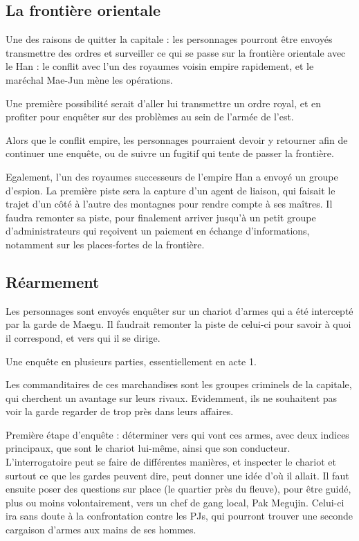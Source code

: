 \documentclass[10pt,a4paper]{book}
\begin{document}
\subsection{La frontière orientale}
Une des raisons de quitter la capitale : les personnages pourront être envoyés transmettre des ordres et surveiller ce qui se passe sur la frontière orientale avec le Han : le conflit avec l'un des royaumes voisin empire rapidement, et le maréchal Mae-Jun mène les opérations.

Une première possibilité serait d'aller lui transmettre un ordre royal, et en profiter pour enquêter sur des problèmes au sein de l'armée de l'est.

Alors que le conflit empire, les personnages pourraient devoir y retourner afin de continuer une enquête, ou de suivre un fugitif qui tente de passer la frontière.

Egalement, l'un des royaumes successeurs de l'empire Han a envoyé un groupe d'espion. La première piste sera la capture d'un agent de liaison, qui faisait le trajet d'un côté à l'autre des montagnes pour rendre compte à ses maîtres. Il faudra remonter sa piste, pour finalement arriver jusqu'à un petit groupe d'administrateurs qui reçoivent un paiement en échange d'informations, notamment sur les places-fortes de la frontière.


\subsection{Réarmement}
Les personnages sont envoyés enquêter sur un chariot d'armes qui a été intercepté par la garde de Maegu. Il faudrait remonter la piste de celui-ci pour savoir à quoi il correspond, et vers qui il se dirige.

Une enquête en plusieurs parties, essentiellement en acte 1.

Les commanditaires de ces marchandises sont les groupes criminels de la capitale, qui cherchent un avantage sur leurs rivaux. Evidemment, ils ne souhaitent pas voir la garde regarder de trop près dans leurs affaires.

Première étape d'enquête : déterminer vers qui vont ces armes, avec deux indices principaux, que sont le chariot lui-même, ainsi que son conducteur. L'interrogatoire peut se faire de différentes manières, et inspecter le chariot et surtout ce que les gardes peuvent dire, peut donner une idée d'où il allait. Il faut ensuite poser des questions sur place (le quartier près du fleuve), pour être guidé, plus ou moins volontairement, vers un chef de gang local, Pak Megujin. Celui-ci ira sans doute à la confrontation contre les PJs, qui pourront trouver une seconde cargaison d'armes aux mains de ses hommes.
\end{document}
